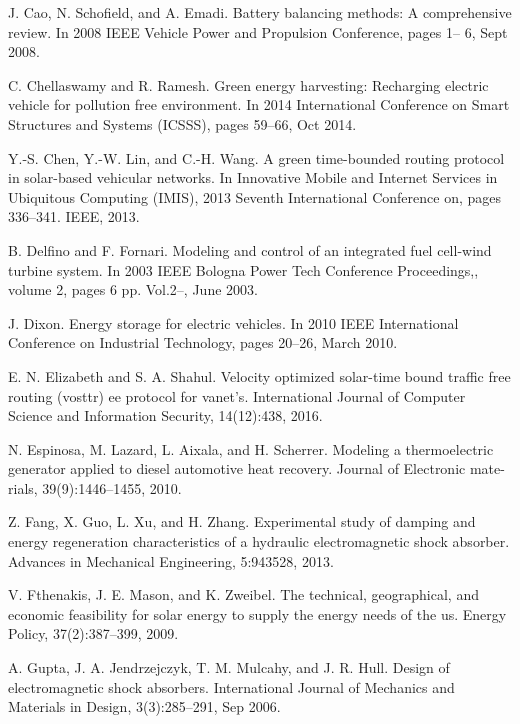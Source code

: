  J. Cao, N. Schofield, and A. Emadi. Battery balancing methods: A comprehensive review. In 2008 IEEE Vehicle Power and Propulsion Conference, pages 1-- 6, Sept 2008.

 C. Chellaswamy and R. Ramesh. Green energy harvesting: Recharging electric vehicle for pollution free environment. In 2014 International Conference on Smart Structures and Systems (ICSSS), pages 59--66, Oct 2014.

 Y.-S. Chen, Y.-W. Lin, and C.-H. Wang. A green time-bounded routing protocol in solar-based vehicular networks. In Innovative Mobile and Internet Services in Ubiquitous Computing (IMIS), 2013 Seventh International Conference on, pages 336--341. IEEE, 2013.

 B. Delfino and F. Fornari. Modeling and control of an integrated fuel cell-wind turbine system. In 2003 IEEE Bologna Power Tech Conference Proceedings,, volume 2, pages 6 pp. Vol.2--, June 2003.

 J. Dixon. Energy storage for electric vehicles. In 2010 IEEE International Conference on Industrial Technology, pages 20--26, March 2010.

 E. N. Elizabeth and S. A. Shahul. Velocity optimized solar-time bound traffic free routing (vosttr) ee protocol for vanet’s. International Journal of Computer Science and Information Security, 14(12):438, 2016.

 N. Espinosa, M. Lazard, L. Aixala, and H. Scherrer. Modeling a thermoelectric generator applied to diesel
automotive heat recovery. Journal of Electronic mate-
rials, 39(9):1446--1455, 2010.

 Z. Fang, X. Guo, L. Xu, and H. Zhang. Experimental
study of damping and energy regeneration characteristics of a hydraulic electromagnetic shock absorber. Advances in Mechanical Engineering, 5:943528, 2013.


 V. Fthenakis, J. E. Mason, and K. Zweibel. The technical, geographical, and economic feasibility for solar energy to supply the energy needs of the us. Energy Policy, 37(2):387--399, 2009.

 A. Gupta, J. A. Jendrzejczyk, T. M. Mulcahy, and J. R. Hull. Design of electromagnetic shock absorbers. International Journal of Mechanics and Materials in Design, 3(3):285--291, Sep 2006.

